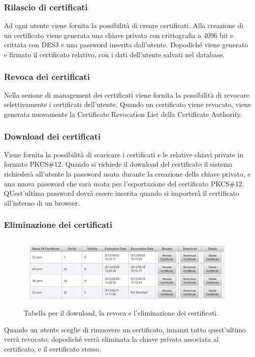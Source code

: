 \documentclass{article}
\begin{document}
\subsubsection*{Rilascio di certificati}
Ad ogni utente viene fornita la possibilità di creare certificati. Alla creazione di un certificato viene generata una chiave privata con crittografia a 4096 bit e crittata con DES3 e una password inserita dall'utente. Dopodiché viene generato e firmato il certificato relativo, con i dati dell'utente salvati nel database.
\subsubsection*{Revoca dei certificati}
Nella sezione di management dei certificati viene fornita la possibilità di revocare selettivamente i certificati dell'utente. Quando un certificato viene revocato, viene generata nuovamente la Certificate Revocation List della Certificate Authority.
\subsubsection*{Download dei certificati}
Viene fornita la possibilità di scaricare i certificati e le relative chiavi private in formato PKCS\#12. Quando si richiede il download del certificato il sistema richiederà all'utente la password usata durante la creazione della chiave privata, e una nuova password che sarà usata per l'esportazione del certificato PKCS\#12. QUest'ultima password dovrà essere inserita quando si importerà il certificato all'interno di un browser.
\subsubsection*{Eliminazione dei certificati}
\begin{figure}[h!]
\centering
\includegraphics[width=\textwidth]{img/revokedownload}
\caption{Tabella per il download, la revoca e l'eliminazione dei certificati.}
\end{figure}
Quando un utente sceglie di rimuovere un certificato, innanzi tutto quest'ultimo verrà revocato; dopodiché verrà eliminata la chiave privata associata al certificato, e il certificato stesso.
\end{document}
